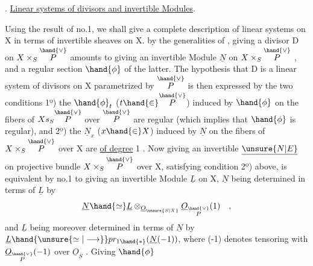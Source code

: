 
. \uline{Linear systems of divisors and invertible Modules}.

Using the result of no.1, we shall give a complete description
of linear systems on X in terms of invertible sheaves
on X.   by the generalities of , giving a
 divisor D on $X\times_S\overset{\hand{\vee}}{P}$  amounts to
giving an invertible Module $\underline{N}$ on $X\times_S\overset{\hand{\vee}}{P}$ , and a regular section
$\hand{\phi}$ of the latter.  The hypothesis that D is a linear system of
divisors on X parametrized by $\overset{\hand{\vee}}{P}$ is then expressed by the two conditions
1º) the $\hand{\phi}_t$ ($t\hand{\in}\overset{\hand{\vee}}{P}$) induced by $\hand{\phi}$ on the fibers of $Xs_S\overset{\hand{\vee}}{P}$ over $\overset{\hand{\vee}}{P}$
are regular (which implies that $\hand{\phi}$ is regular), and 2º) the $\underline{N}_x$ ($x\hand{\in} X$)
induced by $\underline{N}$  on the fibers of $X\times_S\overset{\hand{\vee}}{P}$ over X are \uline{of degree} 1 .
Now giving an invertible $\underline{\unsure{N|E}}$ on  projective bundle $X\times_S\overset{\hand{\vee}}{P}$ over X,
satisfying condition 2º) above, is equivalent by no.1
to giving an invertible Module $\underline{L}$ on X, $\underline{N}$ being determined in terms
of $\underline{L}$ by
\[ \underline{N}\hand{\simeq}\underline{L}\otimes_{\underline{O}_{\unsure{S|X}}}\underline{O}_{\overset{\hand{\vee}}{P}}(1) \quad , \]
and $\underline{L}$ being moreover determined in terms of $\underline{N}$ by $\underline{L}\hand{\unsure{\simeq|\longrightarrow}} pr_{1\hand{*}}(\underline{N}(-1))$,
where (-1) denotes  tensoring with $\underline{O}_{\overset{\hand{\vee}}{P}}(-1)$ over $\underline{O}_S$ . Giving $\hand{\phi}$
